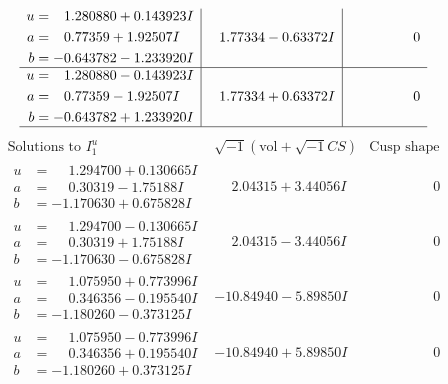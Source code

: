\documentclass[1p]{elsarticle_modified}
\theoremstyle{definition}
\newcommand{\I}{\sqrt{-1}}
\begin{document}
$$\begin{array}{c|c|c}
\begin{aligned}
u &= \phantom{-}1.280880 + 0.143923 I \\
a &= \phantom{-}0.77359 + 1.92507 I \\
b &= -0.643782 - 1.233920 I\end{aligned}
 & \phantom{-}1.77334 - 0.63372 I & \phantom{-0.000000 } 0 \\ \hline\begin{aligned}
u &= \phantom{-}1.280880 - 0.143923 I \\
a &= \phantom{-}0.77359 - 1.92507 I \\
b &= -0.643782 + 1.233920 I\end{aligned}
 & \phantom{-}1.77334 + 0.63372 I & \phantom{-0.000000 } 0\\
 \hline 
 \end{array}$$\newpage$$\begin{array}{c|c|c}  
\text{Solutions to }I^u_{1}& \I (\text{vol} + \sqrt{-1}CS) & \text{Cusp shape}\\
 \hline 
\begin{aligned}
u &= \phantom{-}1.294700 + 0.130665 I \\
a &= \phantom{-}0.30319 - 1.75188 I \\
b &= -1.170630 + 0.675828 I\end{aligned}
 & \phantom{-}2.04315 + 3.44056 I & \phantom{-0.000000 } 0 \\ \hline\begin{aligned}
u &= \phantom{-}1.294700 - 0.130665 I \\
a &= \phantom{-}0.30319 + 1.75188 I \\
b &= -1.170630 - 0.675828 I\end{aligned}
 & \phantom{-}2.04315 - 3.44056 I & \phantom{-0.000000 } 0 \\ \hline\begin{aligned}
u &= \phantom{-}1.075950 + 0.773996 I \\
a &= \phantom{-}0.346356 - 0.195540 I \\
b &= -1.180260 - 0.373125 I\end{aligned}
 & -10.84940 - 5.89850 I & \phantom{-0.000000 } 0 \\ \hline\begin{aligned}
u &= \phantom{-}1.075950 - 0.773996 I \\
a &= \phantom{-}0.346356 + 0.195540 I \\
b &= -1.180260 + 0.373125 I\end{aligned}
 & -10.84940 + 5.89850 I & \phantom{-0.000000 } 0 \\ \hline\begin{aligned}

\end{aligned}
\end{array}$$
\end{document}
